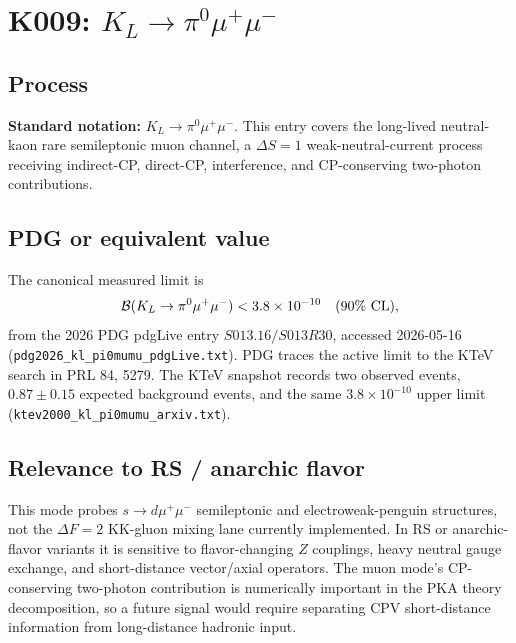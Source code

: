 
\section{K009: \(K_L \to \pi^0\mu^+\mu^-\)}

\subsection*{Process}
\textbf{Standard notation:} \(K_L \to \pi^0\mu^+\mu^-\).  This entry covers the
long-lived neutral-kaon rare semileptonic muon channel, a \(\Delta S=1\)
weak-neutral-current process receiving indirect-CP, direct-CP, interference,
and CP-conserving two-photon contributions.

\subsection*{PDG or equivalent value}
The canonical measured limit is
\[
  {\cal B}(K_L \to \pi^0\mu^+\mu^-) < 3.8\times10^{-10}
  \quad(90\%\ {\rm CL}),
\]
from the 2026 PDG pdgLive entry \(S013.16/S013R30\), accessed 2026-05-16
(\texttt{pdg2026\_kl\_pi0mumu\_pdgLive.txt}).  PDG traces the active limit to
the KTeV search in PRL 84, 5279.  The KTeV snapshot records two observed
events, \(0.87\pm0.15\) expected background events, and the same
\(3.8\times10^{-10}\) upper limit
(\texttt{ktev2000\_kl\_pi0mumu\_arxiv.txt}).

\subsection*{Relevance to RS / anarchic flavor}
This mode probes \(s\to d\mu^+\mu^-\) semileptonic and electroweak-penguin
structures, not the \(\Delta F=2\) KK-gluon mixing lane currently implemented.
In RS or anarchic-flavor variants it is sensitive to flavor-changing \(Z\)
couplings, heavy neutral gauge exchange, and short-distance vector/axial
operators.  The muon mode's CP-conserving two-photon contribution is
numerically important in the PKA theory decomposition, so a future signal would
require separating CPV short-distance information from long-distance hadronic
input.

